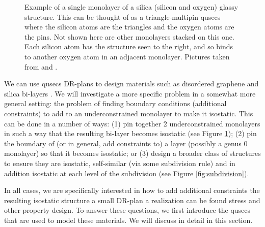 \begin{figure}
    \caption{Example of a single monolayer of a silica (silicon and oxygen) glassy structure. This can be thought of as a triangle-multipin qusecs where the silicon atoms are the triangles and the oxygen atoms are the pins. Not shown here are other monolayers stacked on this one. Each silicon atom has the structure seen to the right, and so binds to another oxygen atom in an adjacent monolayer. Pictures taken from \cite{silica_figure} and \cite{tetra_silica_figure}.}
    \label{fig:silica_glass}
\end{figure}


We can use qusecs DR-plans to design materials such as disordered graphene and silica bi-layers \cite{silica_bilayers} \cite{sructure_of_2d_glass}. We will investigate a more specific problem in a somewhat more general setting: the problem of finding boundary conditions (additional constraints) to add to an underconstrained monolayer to make it isostatic. This can be done in a number of ways: (1) pin together 2 underconstrained monolayers in such a way that the resulting bi-layer becomes isostatic (see Figure \ref{fig:silica_glass}); (2) pin the boundary of (or in general, add constraints to) a layer (possibly a genus 0 monolayer) so that it becomes isostatic; or (3) design a broader class of structures to ensure they are isostatic, self-similar (via some subdivision rule) and in addition isostatic at each level of the subdivision (see Figure \ref{fig:subdivision}).

In all cases, we are specifically interested in how to add additional constraints  the resulting isostatic structure   a small DR-plan  a realization can be found  stress and other property design. To answer these questions, we first introduce the qusecs that are used to model these materials. We will discuss   in detail in this section.


